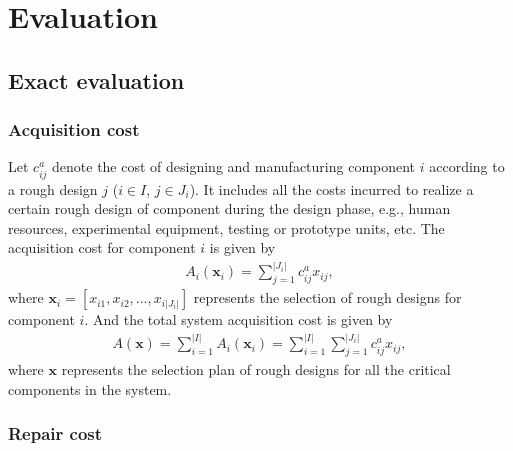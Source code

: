 \documentclass[preprint,12pt]{elsarticle}
\begin{document}
\section{Evaluation}
\subsection{Exact evaluation}

\subsubsection{Acquisition cost}
	
	Let $c_{ij}^{a}$ denote the cost of designing and manufacturing component $i$ according to a rough design $j$ ($i \in I$, $j \in J_{i}$). It includes all the costs incurred to realize a certain rough design of component during the design phase, e.g., human resources, experimental equipment, testing or prototype units, etc. The acquisition cost for component $i$ is given by
\begin{eqnarray}
A_{i}(\boldsymbol{x}_{i})=\sum^{\lvert J_{i} \rvert}_{j=1} {c_{ij}^{a} x_{ij}},
\label{Ai}
\end{eqnarray}
where $\boldsymbol{x}_{i}=[x_{i1},x_{i2},...,x_{i\lvert J_{i}\rvert}]$ represents the selection of rough designs for component $i$.
And the total system acquisition cost is given by
\begin{eqnarray}
A(\boldsymbol{x})=\sum ^{\lvert I \rvert}_{i=1}A_{i}(\boldsymbol{x}_{i})=\sum ^{\lvert I \rvert}_{i=1}\sum^{\lvert J_{i} \rvert}_{j=1} {c_{ij}^{a} x_{ij}}, \label{A}
\end{eqnarray}
where $\boldsymbol{x}$ represents the selection plan of rough designs for all the critical components in the system.
	
\subsubsection{Repair cost}
	
\end{document}

